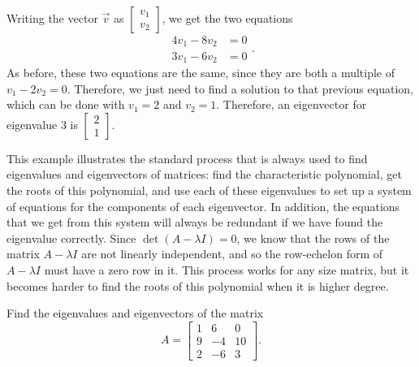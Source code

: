 \documentclass{ximera}
\begin{document}
\begin{exampleSol}
    Writing the vector $\vec{v}$ as $\begin{bmatrix} v_1 \\ v_2 \end{bmatrix}$, we get the two equations
    \[
        \begin{split}
            4v_1 - 8v_2 &= 0 \\
            3v_1 - 6v_2 &= 0
        \end{split}.
    \]
    As before, these two equations are the same, since they are both a multiple of $v_1 - 2v_2 = 0$. Therefore, we just need to find a solution to that previous equation, which can be done with $v_1 = 2$ and $v_2 = 1$. Therefore, an eigenvector for eigenvalue $3$ is $\begin{bmatrix} 2 \\ 1 \end{bmatrix}$. 
\end{exampleSol}

This example illustrates the standard process that is always used to find eigenvalues and eigenvectors of matrices: find the characteristic polynomial, get the roots of this polynomial, and use each of these eigenvalues to set up a system of equations for the components of each eigenvector. In addition, the equations that we get from this system will always be redundant if we have found the eigenvalue correctly. Since $\det(A - \lambda I) = 0$, we know that the rows of the matrix $A - \lambda I$ are not linearly independent, and so the row-echelon form of $A - \lambda I$ must have a zero row in it. This process works for any size matrix, but it becomes harder to find the roots of this polynomial when it is higher degree. 

\begin{example}
    Find the eigenvalues and eigenvectors of the matrix
    \[ 
        A = 
        \begin{bmatrix} 
            1 & 6 & 0 \\ 
            9 & -4 & 10 \\ 
            2 & -6 & 3 
        \end{bmatrix}. 
    \]
\end{example}
\end{document}
